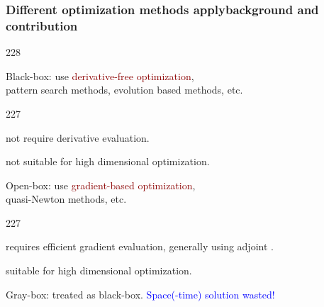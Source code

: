\documentclass{beamer}
\let\oldcite=\cite
\renewcommand{\cite}[1]{\textcolor[rgb]{.4,.4,.85}{\oldcite{#1}}}
\newcommand{\barrow}{\item[\color{darkred}\ding{228}]}
\newcommand{\carrow}{\item[\color{darkred}\ding{227}]}
\begin{document}
\begin{frame}
    \frametitle{Different optimization methods apply\hfill \scriptsize{background and contribution}}\small
    \begin{dinglist}{228}
        \barrow {Black-box}: use \textcolor{darkred}{derivative-free optimization},\\
                \scriptsize{
                pattern search methods, evolution based methods, etc.}
                \small
                \begin{dinglist}{227}
                    \carrow not require derivative evaluation.
                    \vspace{.15cm}
                    \carrow not suitable for high dimensional optimization.
                \end{dinglist}

                \vspace{.15cm}
        \barrow Open-box: use \textcolor{darkred}{gradient-based optimization},\\
                \scriptsize
                quasi-Newton methods, etc. %
                \small
                \begin{dinglist}{227}
                    \carrow requires efficient gradient evaluation, generally using adjoint 
                    \scriptsize \cite{Lions 71} \small.
                    \vspace{.15cm}
                    \carrow suitable for high dimensional optimization.
                \end{dinglist}

                \vspace{.15cm}
        \barrow Gray-box: treated as black-box. 
                \textcolor{blue}{Space(-time) solution wasted!}
    \end{dinglist}
\end{frame}
\end{document}
